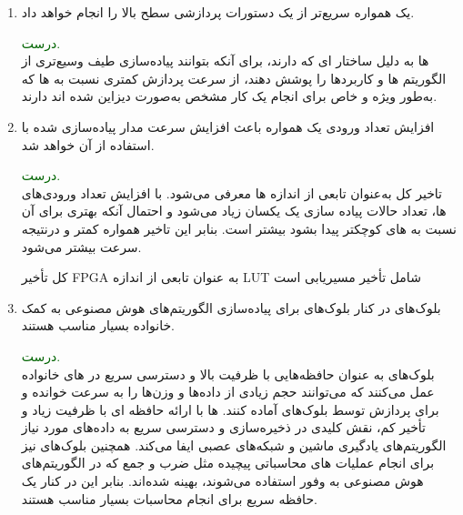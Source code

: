 \begin{enumerate}
\begin{qsolve}
	\end{qsolve}
	
	
	
	
	\item 
	یک  همواره سریع‌تر از یک  دستورات پردازشی سطح بالا را انجام خواهد داد.
	\begin{qsolve}
		\textcolor{darkgreen}{درست.}\\
		ها به دلیل ساختار  ای که دارند، برای آنکه بتوانند پیاده‌سازی طیف وسیع‌تری از الگوریتم ها و کاربرد‌ها را پوشش دهند، از سرعت پردازش کمتری نسبت به  ها که به‌طور ویژه و خاص برای انجام یک کار مشخص به‌صورت  دیزاین شده اند دارند.
		
	\end{qsolve}
	
	
	
	\item 
	افزایش تعداد ورودی یک  همواره باعث افزایش سرعت مدار پیاده‌سازی شده با استفاده از آن خواهد شد.
	\begin{qsolve}
		\textcolor{darkgreen}{درست.}\\
		تاخیر کل  به‌عنوان تابعی از اندازه  ها معرفی می‌شود. با افزایش تعداد ورودی‌های  ها، تعداد حالات پیاده سازی یک  یکسان زیاد می‌شود و احتمال آنکه  بهتری برای آن نسبت به  های کوچکتر پیدا بشود بیشتر است. بنابر این تاخیر همواره کمتر و درنتیجه سرعت بیشتر می‌شود.
		
		
		کل تأخیر FPGA به عنوان تابعی از اندازه LUT شامل تأخیر مسیریابی است
	\end{qsolve}
	
	
	
	
	\item 
	بلوک‌های  در کنار بلوک‌های  برای پیاده‌سازی الگوریتم‌های هوش مصنوعی به کمک  خانواده  بسیار مناسب هستند.
	\begin{qsolve}
		\textcolor{darkgreen}{درست.}\\
		بلوک‌های  به عنوان حافظه‌هایی با ظرفیت بالا و دسترسی سریع در  های خانواده  عمل می‌کنند که می‌توانند حجم زیادی از داده‌ها و وزن‌ها را به سرعت خوانده و برای پردازش توسط بلوک‌های  آماده کنند.  ها با ارائه حافظه ای با ظرفیت زیاد و تأخیر کم، نقش کلیدی در ذخیره‌سازی و دسترسی سریع به داده‌های مورد نیاز الگوریتم‌های یادگیری ماشین و شبکه‌های عصبی ایفا می‌کند. همچنین بلوک‌های  نیز برای انجام عملیات های محاسباتی پیچیده مثل ضرب و جمع که در الگوریتم‌های هوش مصنوعی به وفور استفاده می‌شوند، بهینه شده‌اند. بنابر این در کنار یک حافظه سریع برای انجام محاسبات بسیار مناسب هستند.
		
	\end{qsolve}
	
	
\end{enumerate}
